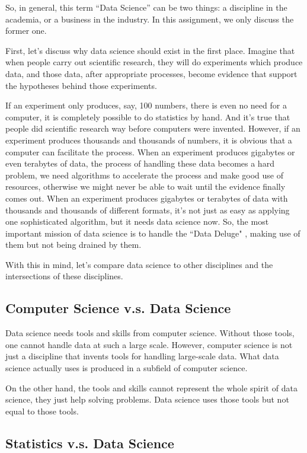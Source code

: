 So, in general, this term ``Data Science'' can be two things: a discipline in the academia, or a business in the industry.
In this assignment, we only discuss the former one.

First, let's discuss why data science should exist in the first place.
Imagine that when people carry out scientific research, they will do experiments which produce data, and those data, after appropriate processes, become evidence that support the hypotheses behind those experiments.

If an experiment only produces, say, 100 numbers, there is even no need for a computer, it is completely possible to do statistics by hand.
And it's true that people did scientific research way before computers were invented.
However, if an experiment produces thousands and thousands of numbers, it is obvious that a computer can facilitate the process.
When an experiment produces gigabytes or even terabytes of data, the process of handling these data becomes a hard problem, we need algorithms to accelerate the process and make good use of resources, otherwise we might never be able to wait until the evidence finally comes out.
When an experiment produces gigabytes or terabytes of data with thousands and thousands of different formats, it's not just as easy as applying one sophisticated algorithm, but it needs data science now. 
So, the most important mission of data science is to handle the ``Data Deluge" \cite{hey_data_2003}, making use of them but not being drained by them.

With this in mind, let's compare data science to other disciplines and the intersections of these disciplines.

\subsection*{Computer Science v.s. Data Science}

Data science needs tools and skills from computer science.
Without those tools, one cannot handle data at such a large scale.
However, computer science is not just a discipline that invents tools for handling large-scale data.
What data science actually uses is produced in a subfield of computer science.

On the other hand, the tools and skills cannot represent the whole spirit of data science, they just help solving problems.
Data science uses those tools but not equal to those tools.

\subsection*{Statistics v.s. Data Science}

